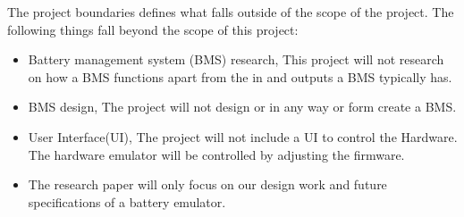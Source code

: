 The project boundaries defines what falls outside of the scope of the project.
The following things fall beyond the scope of this project:
\begin{itemize}
    \item Battery management system (BMS) research, This project will not research on how a BMS functions apart from the in and outputs a BMS typically has.
    \item BMS design, The project will not design or in any way or form create a BMS.
    \item User Interface(UI), The project will not include a UI to control the Hardware. The hardware emulator will be controlled by adjusting the firmware.
    \item The research paper will only focus on our design work and future specifications of a battery emulator.
\end{itemize}